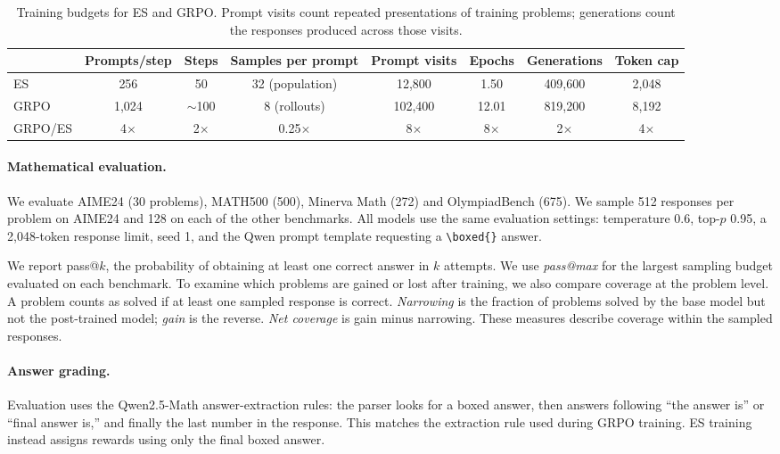 \documentclass[10pt]{article}
\begin{document}
\begin{table}[H]\centering\small
\begin{tabular}{lccccccc}\toprule
 & Prompts/step & Steps & Samples per prompt & Prompt visits & Epochs & Generations & Token cap\\\midrule
ES & 256 & 50 & 32 (population) & 12,800 & 1.50 & 409,600 & 2,048\\
GRPO & 1,024 & $\sim$100 & 8 (rollouts) & 102,400 & 12.01 & 819,200 & 8,192\\
GRPO/ES & 4$\times$ & 2$\times$ & 0.25$\times$ & 8$\times$ & 8$\times$ & 2$\times$ & 4$\times$\\\bottomrule
\end{tabular}
\caption{Training budgets for ES and GRPO. Prompt visits count repeated presentations of training problems; generations count the responses produced across those visits.}
\label{tab:budget}
\end{table}

\paragraph{Mathematical evaluation.} We evaluate AIME24 (30 problems), MATH500 (500), Minerva Math (272) and OlympiadBench (675). We sample 512 responses per problem on AIME24 and 128 on each of the other benchmarks. All models use the same evaluation settings: temperature 0.6, top-$p$ 0.95, a 2,048-token response limit, seed 1, and the Qwen prompt template requesting a \verb|\boxed{}| answer.

We report pass@$k$, the probability of obtaining at least one correct answer in $k$ attempts. We use \emph{pass@max} for the largest sampling budget evaluated on each benchmark. To examine which problems are gained or lost after training, we also compare coverage at the problem level. A problem counts as solved if at least one sampled response is correct. \emph{Narrowing} is the fraction of problems solved by the base model but not the post-trained model; \emph{gain} is the reverse. \emph{Net coverage} is gain minus narrowing. These measures describe coverage within the sampled responses.

\paragraph{Answer grading.} Evaluation uses the Qwen2.5-Math answer-extraction rules: the parser looks for a boxed answer, then answers following ``the answer is'' or ``final answer is,'' and finally the last number in the response. This matches the extraction rule used during GRPO training. ES training instead assigns rewards using only the final boxed answer.
\end{document}
